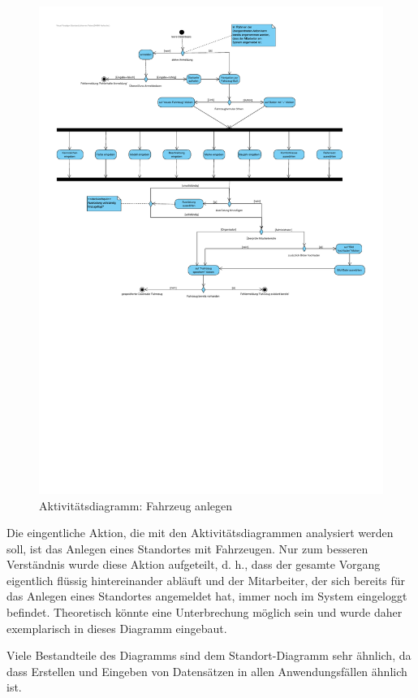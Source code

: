 \begin{figure}[!ht]
    \centering
    \includegraphics[width=\textwidth, trim = 0cm 11cm 0cm 0cm]{Bilder/Diagramme/AD_Fahrzeug_anlegen.pdf}
    \caption{Aktivitätsdiagramm: Fahrzeug anlegen}
    \label{img:fahrzeug}
\end{figure}

Die eingentliche Aktion, die mit den Aktivitätsdiagrammen analysiert werden soll, ist das Anlegen eines Standortes mit Fahrzeugen. Nur zum besseren Verständnis wurde diese Aktion aufgeteilt, d. h., dass der gesamte Vorgang eigentlich flüssig hintereinander abläuft und der Mitarbeiter, der sich bereits für das Anlegen eines Standortes angemeldet hat, immer noch im System eingeloggt befindet. Theoretisch könnte eine Unterbrechung möglich sein und wurde daher exemplarisch in dieses Diagramm eingebaut. 


Viele Bestandteile des Diagramms sind dem Standort-Diagramm sehr ähnlich, da dass Erstellen und Eingeben von Datensätzen in allen Anwendungsfällen ähnlich ist.



